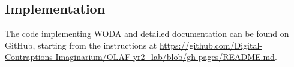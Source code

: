 \subsection{Implementation}

\begin{sloppypar} %
The code implementing WODA and detailed documentation can be found on GitHub, starting from the instructions at \url{https://github.com/Digital-Contraptions-Imaginarium/OLAF-yr2_lab/blob/gh-pages/README.md}.
\end{sloppypar}